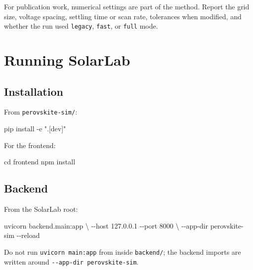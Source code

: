 \documentclass[
  11pt,
  american,
]{report}
\newenvironment{Shaded}{}{}
\newcommand{\AttributeTok}[1]{\textcolor[rgb]{0.49,0.56,0.16}{#1}}
\newcommand{\BuiltInTok}[1]{#1}
\newcommand{\DataTypeTok}[1]{\textcolor[rgb]{0.56,0.13,0.00}{#1}}
\newcommand{\ExtensionTok}[1]{#1}
\newcommand{\NormalTok}[1]{#1}
\newcommand{\StringTok}[1]{\textcolor[rgb]{0.25,0.44,0.63}{#1}}
\begin{document}
For publication work, numerical settings are part of the method. Report
the grid size, voltage spacing, settling time or scan rate, tolerances
when modified, and whether the run used \texttt{legacy}, \texttt{fast},
or \texttt{full} mode.

\hypertarget{running-solarlab}{%
\chapter{Running SolarLab}\label{running-solarlab}}

\hypertarget{installation}{%
\section{Installation}\label{installation}}

From \texttt{perovskite-sim/}:

\begin{Shaded}
\begin{Highlighting}[]
\ExtensionTok{pip}\NormalTok{ install }\AttributeTok{{-}e} \StringTok{".[dev]"}
\end{Highlighting}
\end{Shaded}

For the frontend:

\begin{Shaded}
\begin{Highlighting}[]
\BuiltInTok{cd}\NormalTok{ frontend}
\ExtensionTok{npm}\NormalTok{ install}
\end{Highlighting}
\end{Shaded}

\hypertarget{backend}{%
\section{Backend}\label{backend}}

From the SolarLab root:

\begin{Shaded}
\begin{Highlighting}[]
\ExtensionTok{uvicorn}\NormalTok{ backend.main:app }\DataTypeTok{\textbackslash{}}
  \AttributeTok{{-}{-}host}\NormalTok{ 127.0.0.1 }\AttributeTok{{-}{-}port}\NormalTok{ 8000 }\DataTypeTok{\textbackslash{}}
  \AttributeTok{{-}{-}app{-}dir}\NormalTok{ perovskite{-}sim }\AttributeTok{{-}{-}reload}
\end{Highlighting}
\end{Shaded}

Do not run \texttt{uvicorn\ main:app} from inside \texttt{backend/}; the
backend imports are written around \texttt{-\/-app-dir\ perovskite-sim}.
\end{document}
